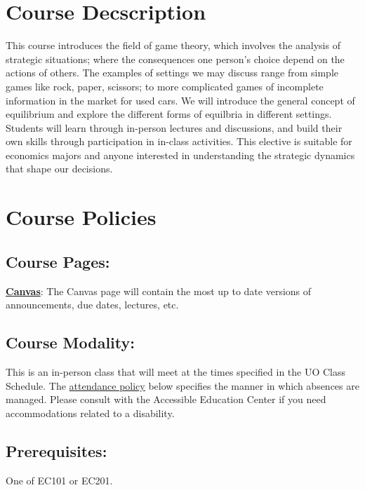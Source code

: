 \section*{Course Decscription}

This course introduces the field of game theory, which involves the analysis of strategic situations; where the consequences one person's choice depend on the actions of others.
The examples of settings we may discuss range from simple games like rock, paper, scissors; to more complicated games of incomplete information in the market for used cars. 
We will introduce the general concept of equilibrium and explore the different forms of equilbria in different settings.
Students will learn through in-person lectures and discussions,
and build their own skills through participation in in-class activities.
This elective is suitable for economics majors and anyone interested in understanding the strategic dynamics that shape our decisions.

\section*{Course Policies}

\subsection*{Course Pages:}

 \href{https://canvas.uoregon.edu/courses/274671}{\textbf{Canvas}}:
  The Canvas page will contain the most up to date versions of announcements, due dates, lectures, etc. 

\subsection*{Course Modality:}

This is an in-person class that will meet at the times specified in the UO Class Schedule.
The \hyperlink{sec:attendance}{attendance policy} below specifies the manner in which absences are managed.
Please consult with the Accessible Education Center if you need accommodations related to a disability.

\subsection*{Prerequisites:}

  One of EC101 or EC201.

